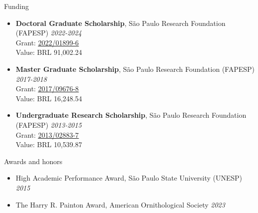 \documentclass{resume}
\begin{document}
\begin{rSection}{Funding} 
\begin{itemize}
\item {\bf Doctoral Graduate Scholarship}{, São Paulo Research Foundation (FAPESP)
} \hfill{\em 2022-2024} 
\\ Grant: \href{https://bv.fapesp.br/en/bolsas/203713/landscape-structure-as-a-predictor-of-taxonomic-and-functional-diversity-of-amphibians-in-the-atlant/}{\underline{2022/01899-6}} 
\\Value: BRL 91,002.24

\item {\bf Master Graduate Scholarship}{, São Paulo Research Foundation (FAPESP)
} \hfill{\em 2017-2018} 
\\ Grant: \href{https://bv.fapesp.br/en/bolsas/172826/effect-of-landscape-modifications-and-climate-changes-on-the-persistence-of-amphibians-in-the-atlant/}{\underline{2017/09676-8}} 
\\ Value: BRL 16,248.54

\item {\bf Undergraduate Research Scholarship}{, São Paulo Research Foundation (FAPESP)
} \hfill{\em 2013-2015} 
\\ Grant: \href{https://bv.fapesp.br/en/bolsas/142421/effect-of-fragmentation-on-the-persistence-of-anuran-amphibians-amphibia-anura-within-the-atlanti/}{\underline{2013/02883-7}} 
\\ Value: BRL 10,539.87
\end{itemize}
\end{rSection}


\begin{rSection}{Awards and honors} 
\begin{itemize}
\item {High Academic Performance Award, São Paulo State University (UNESP)} \hfill{\em 2015}
\item {The Harry R. Painton Award, American Ornithological Society} \hfill{\em 2023}
\end{itemize}
\end{rSection}

\end{document}
